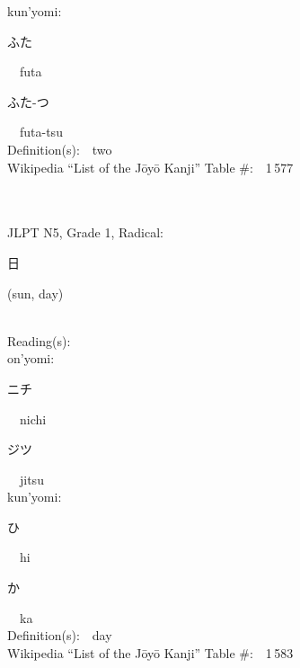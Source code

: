 \begin{multicols}{2}
{\hspace*{1em}}kun'yomi:\ \ \\
{\hspace*{2em}}{\begin{CJK}{UTF8}{min} ふた \end{CJK}}\ \ futa\ \ \\
{\hspace*{2em}}{\begin{CJK}{UTF8}{min} ふた-つ \end{CJK}}\ \ futa-tsu\ \ \\
Definition(s):\ \ two \\
Wikipedia ``List of the J\=oy\=o Kanji'' Table \#:\ \ 1\,577 \\
\ \ \\
{\fontsize{34pt}{40pt}  }\ \ \\  %
{JLPT N5, Grade 1, Radical:\ \ {\begin{CJK}{UTF8}{min} 日 \end{CJK}} (sun, day) } \\
Reading(s):\ \ \\
{\hspace*{1em}}on'yomi:\ \ \\
{\hspace*{2em}}{\begin{CJK}{UTF8}{min} ニチ \end{CJK}}\ \ nichi\ \ \\
{\hspace*{2em}}{\begin{CJK}{UTF8}{min} ジツ \end{CJK}}\ \ jitsu\ \ \\
{\hspace*{1em}}kun'yomi:\ \ \\
{\hspace*{2em}}{\begin{CJK}{UTF8}{min} ひ \end{CJK}}\ \ hi\ \ \\
{\hspace*{2em}}{\begin{CJK}{UTF8}{min} か \end{CJK}}\ \ ka\ \ \\
Definition(s):\ \ day \\
Wikipedia ``List of the J\=oy\=o Kanji'' Table \#:\ \ 1\,583 \\

\end{multicols}
